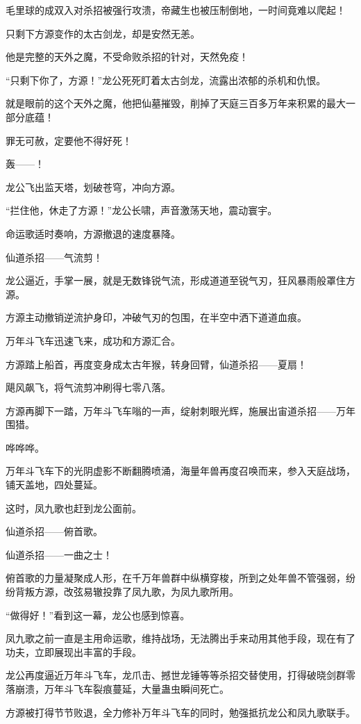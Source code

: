 \begin{this_body}
毛里球的成双入对杀招被强行攻溃，帝藏生也被压制倒地，一时间竟难以爬起！

只剩下方源变作的太古剑龙，却是安然无恙。

他是完整的天外之魔，不受命败杀招的针对，天然免疫！

“只剩下你了，方源！”龙公死死盯着太古剑龙，流露出浓郁的杀机和仇恨。

就是眼前的这个天外之魔，他把仙墓摧毁，削掉了天庭三百多万年来积累的最大一部分底蕴！

罪无可赦，定要他不得好死！

轰——！

龙公飞出监天塔，划破苍穹，冲向方源。

“拦住他，休走了方源！”龙公长啸，声音激荡天地，震动寰宇。

命运歌适时奏响，方源撤退的速度暴降。

仙道杀招——气流剪！

龙公逼近，手掌一展，就是无数锋锐气流，形成道道至锐气刃，狂风暴雨般罩住方源。

方源主动撤销逆流护身印，冲破气刃的包围，在半空中洒下道道血痕。

万年斗飞车迅速飞来，成功和方源汇合。

方源踏上船首，再度变身成太古年猴，转身回臂，仙道杀招——夏扇！

飓风飙飞，将气流剪冲刷得七零八落。

方源再脚下一踏，万年斗飞车嗡的一声，绽射刺眼光辉，施展出宙道杀招——万年围猎。

哗哗哗。

万年斗飞车下的光阴虚影不断翻腾喷涌，海量年兽再度召唤而来，参入天庭战场，铺天盖地，四处蔓延。

这时，凤九歌也赶到龙公面前。

仙道杀招——俯首歌。

仙道杀招——一曲之士！

俯首歌的力量凝聚成人形，在千万年兽群中纵横穿梭，所到之处年兽不管强弱，纷纷背叛方源，改弦易辙投靠了凤九歌，为凤九歌所用。

“做得好！”看到这一幕，龙公也感到惊喜。

凤九歌之前一直是主用命运歌，维持战场，无法腾出手来动用其他手段，现在有了功夫，立即展现出丰富的手段。

龙公再度逼近万年斗飞车，龙爪击、撼世龙锤等等杀招交替使用，打得破晓剑群零落崩溃，万年斗飞车裂痕蔓延，大量蛊虫瞬间死亡。

方源被打得节节败退，全力修补万年斗飞车的同时，勉强抵抗龙公和凤九歌联手。


\end{this_body}
